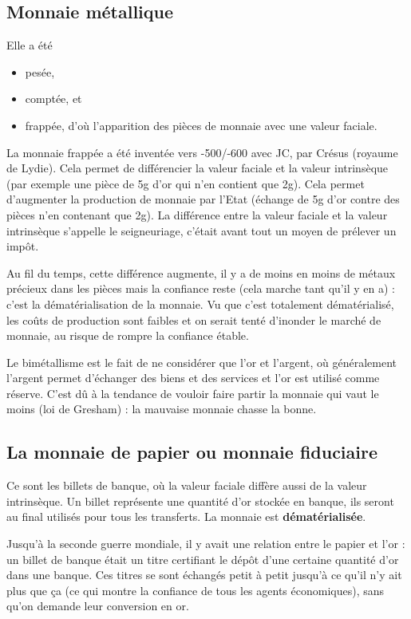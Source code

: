 	\subsection{Monnaie métallique}
		
	Elle a été
		
	\begin{itemize}
		\item pesée,
		\item comptée, et
		\item frappée, d'où l'apparition des pièces de monnaie avec une valeur faciale.
	\end{itemize}
		
	La monnaie frappée a été inventée vers -500/-600 avec JC, par Crésus (royaume de Lydie). Cela permet de différencier la valeur faciale et la valeur intrinsèque (par exemple une pièce de 5g d'or qui n'en contient que 2g). Cela permet d'augmenter la production de monnaie par l'Etat (échange de 5g d'or contre des pièces n'en contenant que 2g). La différence entre la valeur faciale et la valeur intrinsèque s'appelle le seigneuriage, c'était avant tout un moyen de prélever un impôt.
		
	Au fil du temps, cette différence augmente, il y a de moins en moins de métaux précieux dans les pièces mais la confiance reste (cela marche tant qu'il y en a) : c'est la dématérialisation de la monnaie. Vu que c'est totalement dématérialisé, les coûts de production sont faibles et on serait tenté d'inonder le marché de monnaie, au risque de rompre la confiance étable.
		
	Le bimétallisme est le fait de ne considérer que l'or et l'argent, où généralement l'argent permet d'échanger des biens et des services et l'or est utilisé comme réserve. C'est dû à la tendance de vouloir faire partir la monnaie qui vaut le moins (loi de Gresham) : la mauvaise monnaie chasse la bonne.
		
	\subsection{La monnaie de papier ou monnaie fiduciaire}
		
		Ce sont les billets de banque, où la valeur faciale diffère aussi de la valeur intrinsèque. Un billet représente une quantité d'or stockée en banque, ils seront au final utilisés pour tous les transferts. La monnaie est \textbf{dématérialisée}.
		
		Jusqu'à la seconde guerre mondiale, il y avait une relation entre le papier et l'or : un billet de banque était un titre certifiant le dépôt d'une certaine quantité d'or dans une banque. Ces titres se sont échangés petit à petit jusqu'à ce qu'il n'y ait plus que ça (ce qui montre la confiance de tous les agents économiques), sans qu'on demande leur conversion en or.
		
